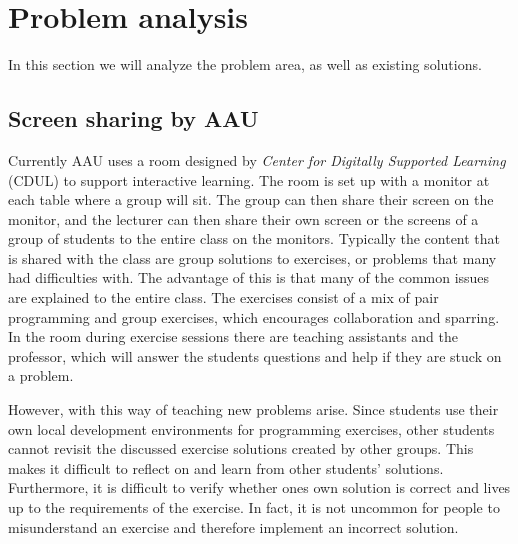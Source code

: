 \section{Problem analysis}
In this section we will analyze the problem area, as well as existing solutions. 

\subsection*{Screen sharing by AAU}
Currently AAU uses a room designed by \textit{Center for Digitally Supported Learning} (CDUL) to support interactive learning. 
The room is set up with a monitor at each table where a group will sit. The group can then share their screen on the monitor, and the lecturer can then share their own screen or the screens of a group of students to the entire class on the monitors. 
Typically the content that is shared with the class are group solutions to exercises, or problems that many had difficulties with.
The advantage of this is that many of the common issues are explained to the entire class.
The exercises consist of a mix of pair programming and group exercises, which encourages collaboration and sparring.
In the room during exercise sessions there are teaching assistants and the professor, which will answer the students questions and help if they are stuck on a problem. 


However, with this way of teaching new problems arise.
Since students use their own local development environments for programming exercises, other students cannot revisit the discussed exercise solutions created by other groups. This makes it difficult to reflect on and learn from other students' solutions.
Furthermore, it is difficult to verify whether ones own solution is correct and lives up to the requirements of the exercise.
In fact, it is not uncommon for people to misunderstand an exercise and therefore implement an incorrect solution.

